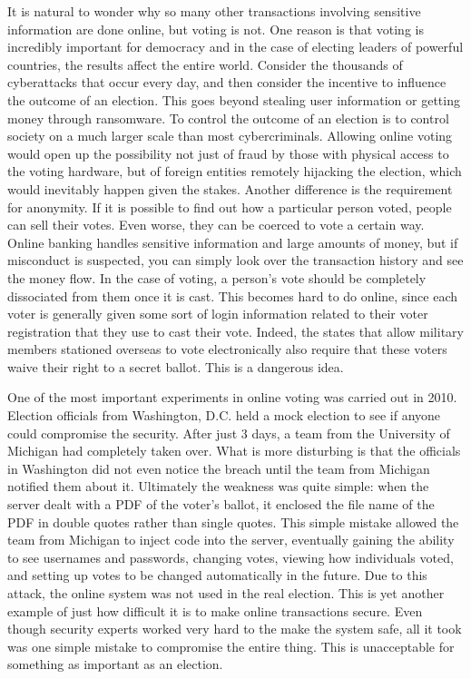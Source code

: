 \documentclass[12pt, titlepage]{article}
\begin{document}
It is natural to wonder why so many other transactions involving sensitive information are done online, but voting is not. One reason is that voting is incredibly important for democracy and in the case of electing leaders of powerful countries, the results affect the entire world. Consider the thousands of cyberattacks that occur every day, and then consider the incentive to influence the outcome of an election. This goes beyond stealing user information or getting money through ransomware. To control the outcome of an election is to control society on a much larger scale than most cybercriminals. Allowing online voting would open up the possibility not just of fraud by those with physical access to the voting hardware, but of foreign entities remotely hijacking the election, which would inevitably happen given the stakes. Another difference is the requirement for anonymity. If it is possible to find out how a particular person voted, people can sell their votes. Even worse, they can be coerced to vote a certain way. Online banking handles sensitive information and large amounts of money, but if misconduct is suspected, you can simply look over the transaction history and see the money flow. In the case of voting, a person's vote should be completely dissociated from them once it is cast. This becomes hard to do online, since each voter is generally given some sort of login information related to their voter registration that they use to cast their vote. Indeed, the states that allow military members stationed overseas to vote electronically also require that these voters waive their right to a secret ballot. \cite{waivesecret} This is a dangerous idea.

One of the most important experiments in online voting was carried out in 2010. Election officials from Washington, D.C. held a mock election to see if anyone could compromise the security. After just 3 days, a team from the University of Michigan had completely taken over. What is more disturbing is that the officials in Washington did not even notice the breach until the team from Michigan notified them about it. \cite{hao2016real} Ultimately the weakness was quite simple: when the server dealt with a PDF of the voter's ballot, it enclosed the file name of the PDF in double quotes rather than single quotes. This simple mistake allowed the team from Michigan to inject code into the server, eventually gaining the ability to see usernames and passwords, changing votes, viewing how individuals voted, and setting up votes to be changed automatically in the future. Due to this attack, the online system was not used in the real election. This is yet another example of just how difficult it is to make online transactions secure. Even though security experts worked very hard to the make the system safe, all it took was one simple mistake to compromise the entire thing. This is unacceptable for something as important as an election.
\end{document}
